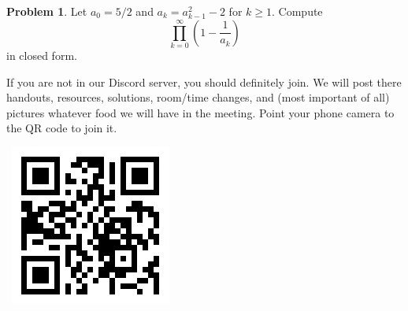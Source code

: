 \documentclass{scrartcl}
\theoremstyle{definition}
\newtheorem{prob}{Problem}
\begin{document}
	\setcounter{prob}{14}
	\begin{prob}%
		Let $a_0=5/2$ and $a_k=a_{k-1}^2-2$ for $k\ge 1.$ Compute \[\prod_{k=0}^{\infty}\left(1-\frac1{a_k}\right)\] in closed form.
	\end{prob}

	\vfill

	\begin{minipage}{.85\textwidth}{}
		\footnotesize
		If you are not in our Discord server, you should definitely join.
		We will post there handouts, resources, solutions, room/time changes, and (most important of all) pictures whatever food we will have in the meeting. Point your phone camera to the QR code to join it.
	\end{minipage}
	\begin{minipage}{.15\textwidth}{}
		\ \hfill \includegraphics[height = .8in]{qr}
	\end{minipage}
\end{document}
